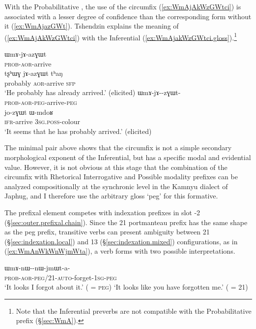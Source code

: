 With the Probabilitative , the use of the circumfix (\ref{ex:WmAjAkWzGWtci}) is associated with a lesser degree of confidence than the corresponding form without it (\ref{ex:WmAjazGWt}). Tshendzin explains the meaning of (\ref{ex:WmAjAkWzGWtci}) with the Inferential (\ref{ex:WmAjakWzGWtci.gloss}).\footnote{
Note that the Inferential preverbs are not compatible with the Probabilitative prefix (§\ref{sec:WmA}). }
 
\begin{exe}
 \ex 
\begin{xlist}
 \ex \label{ex:WmAjazGWt}
\gll ɯmɤ-jɤ-azɣɯt  \\
\textsc{prob}-\textsc{aor}-arrive \\
\ex \label{ex:WmAjazGWt.gloss}
\gll tʂʰɯɣ jɤ-azɣɯt tʰaŋ\\
probably \textsc{aor}-arrive  \textsc{sfp} \\
\glt `He probably has already arrived.' (elicited)
 \ex \label{ex:WmAjAkWzGWtci}
\gll ɯmɤ-jɤ--zɣɯt-  \\
\textsc{prob}-\textsc{aor}-\textsc{peg}-arrive-\textsc{peg} \\
\ex \label{ex:WmAjakWzGWtci.gloss}
\gll jo-zɣɯt ɯ-mdoʁ \\
\textsc{ifr}-arrive \textsc{3sg}.\textsc{poss}-colour \\
\glt `It seems that he has probably arrived.'  (elicited)
\end{xlist}
\end{exe}

The  minimal pair above shows that the circumfix is not a simple secondary morphological exponent of the Inferential, but has a specific modal and evidential value. However, it is not obvious at this stage that the combination of the circumfix with Rhetorical Interrogative and Possible modality prefixes can be analyzed compositionally at the synchronic level in the Kamnyu dialect of Japhug, and I therefore use the arbitrary gloss `peg' for this formative.

The  prefixal element competes with indexation prefixes in slot -2 (§\ref{sec:outer.prefixal.chain}). Since the 2\fl{}1 portmanteau  prefix has the same shape as the peg prefix, transitive verbs can present ambiguity between 2\fl{}1 (§\ref{sec:indexation.local}) and 1\fl{}3 (§\ref{sec:indexation.mixed}) configurations, as in (\ref{ex:WmAnWkWnWjmWta}), a verb forms with two possible interpretations.

\begin{exe}
\ex \label{ex:WmAnWkWnWjmWta}
\gll ɯmɤ-nɯ--nɯ-jmɯt-a- \\
\textsc{prob}-\textsc{aor}-\textsc{peg}/2\fl{}1-\textsc{auto}-forget-\textsc{1sg}-\textsc{peg} \\
\glt `It looks I forgot about it.' ( = \textsc{peg})
\glt `It looks like you have forgotten me.' ( = 2\fl{}1)
\end{exe}

